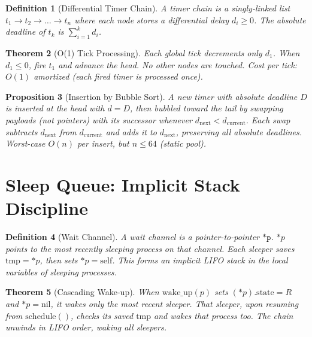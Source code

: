 \documentclass[11pt]{article}
\newtheorem{theorem}{Theorem}[section]
\newtheorem{definition}[theorem]{Definition}
\newtheorem{proposition}[theorem]{Proposition}
\begin{document}
\begin{definition}[Differential Timer Chain]
A timer chain is a singly-linked list $t_1 \to t_2 \to \ldots \to t_n$
where each node stores a \emph{differential delay} $d_i \geq 0$.
The absolute deadline of $t_k$ is $\sum_{i=1}^{k} d_i$.
\end{definition}

\begin{theorem}[O(1) Tick Processing]
Each global tick decrements only $d_1$. When $d_1 \leq 0$, fire $t_1$
and advance the head. No other nodes are touched.
Cost per tick: $O(1)$ amortized (each fired timer is processed once).
\end{theorem}

\begin{proposition}[Insertion by Bubble Sort]
A new timer with absolute deadline $D$ is inserted at the head
with $d = D$, then bubbled toward the tail by swapping payloads
(not pointers) with its successor whenever $d_{\text{next}} < d_{\text{current}}$.
Each swap subtracts $d_{\text{next}}$ from $d_{\text{current}}$ and adds it to
$d_{\text{next}}$, preserving all absolute deadlines.
Worst-case $O(n)$ per insert, but $n \leq 64$ (static pool).
\end{proposition}


\section{Sleep Queue: Implicit Stack Discipline}

\begin{definition}[Wait Channel]
A wait channel is a pointer-to-pointer $\texttt{*p}$.
$*p$ points to the most recently sleeping process on that channel.
Each sleeper saves $\text{tmp} = *p$, then sets $*p = \text{self}$.
This forms an implicit LIFO stack in the local variables of sleeping processes.
\end{definition}

\begin{theorem}[Cascading Wake-up]
When $\text{wake\_up}(p)$ sets $(*p).\text{state} = R$ and $*p = \text{nil}$,
it wakes only the most recent sleeper. That sleeper, upon resuming from
$\text{schedule}()$, checks its saved $\text{tmp}$ and wakes that process too.
The chain unwinds in LIFO order, waking all sleepers.
\end{theorem}
\end{document}
